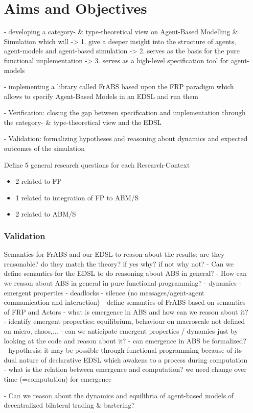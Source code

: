 \chapter{Aims and Objectives}

- developing a category- \& type-theoretical view on Agent-Based Modelling \& Simulation which will 
	-> 1. give a deeper insight into the structure of agents, agent-models and agent-based simulation
	-> 2. serves as the basis for the pure functional implementation
	-> 3. serves as a high-level specification tool for agent-models

- implementing a library called FrABS based upon the FRP paradigm which allows to specify Agent-Based Models in an EDSL and run them

- Verification: closing the gap between specification and implementation through the category- \& type-theoretical view and the EDSL

- Validation: formalizing hypotheses and reasoning about dynamics and expected outcomes of the simulation

Define 5 general research questions for each Research-Context
	\begin{itemize}
    \item 2 related to FP
    \item 1 related to integration of FP to ABM/S
    \item 2 related to ABM/S
    \end{itemize}
    
\subsection{Validation}
Semantics for FrABS and our EDSL to reason about the results: are they reasonable? do they match the theory? if yes why? if not why not?
	- Can we define semantics for the EDSL to do reasoning about ABS in general?
	- How can we reason about ABS in general in pure functional programming?
		- dynamics
		- emergent properties
		- deadlocks
		- silence (no messages/agent-agent communication and interaction)
		- define semantics of FrABS based on semantics of FRP and Actors
		- what is emergence in ABS and how can we reason about it? 
			- identify emergent properties: equilibrium, behaviour on macroscale not defined on micro, chaos,...
			- can we anticipate emergent properties / dynamics just by looking at the code and reason about it?
			- can emergence in ABS be formalized?
				- hypothesis: it may be possible through functional programming because of its dual nature of declarative EDSL which awakens to a process during computation
					- what is the relation between emergence and computation? we need change over time (=computation) for emergence
					
		- Can we reason about the dynamics and equilibria of agent-based models of decentralized bilateral trading \& bartering?
